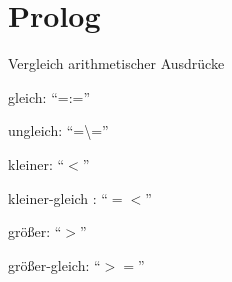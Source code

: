 \chapter{Prolog}
\begin{compactitem}
	\item Vergleich arithmetischer Ausdrücke
		\begin{compactitem}
			\item gleich: \enquote{=:=}
			\item ungleich: \enquote{=\textbackslash =}
			\item kleiner: \enquote{$<$}
			\item kleiner-gleich : \enquote{$=<$}
			\item größer: \enquote{$>$}
			\item größer-gleich: \enquote{$>=$}
		\end{compactitem}
\end{compactitem}